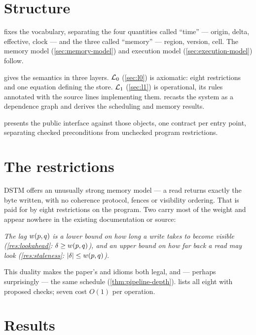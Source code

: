 \section*{Structure}

 fixes the vocabulary, separating the four quantities
called ``time'' --- origin, delta, effective, clock --- and the three called
``memory'' --- region, version, cell. The memory model
(\cref{sec:memory-model}) and execution model (\cref{sec:execution-model})
follow.

 gives the semantics in three layers. $\mathcal{L}_0$
(\cref{sec:l0}) is axiomatic: eight restrictions and one equation defining the
store. $\mathcal{L}_1$ (\cref{sec:l1}) is operational, its rules annotated with the
source lines implementing them.  recasts the system as a
dependence graph and derives the scheduling and memory results.

 presents the public interface against those objects, one
contract per entry point, separating checked preconditions from unchecked
program restrictions.

\section*{The restrictions}

DSTM offers an unusually strong memory model --- a read returns exactly the
byte written, with no coherence protocol, fences or visibility ordering. That
is paid for by eight restrictions on the program. Two carry most of the weight
and appear nowhere in the existing documentation or source:

\begin{center}
\begin{minipage}{0.88\textwidth}
\itshape
The \gls{lag} $w(p,q)$ is a lower bound on how long a write takes to
become visible (\cref{res:lookahead}: $\delta \ge w(p,q)$), and an upper
bound on how far back a read may look (\cref{res:staleness}:
$|\delta| \le w(p,q)$).
\end{minipage}
\end{center}

This duality makes the paper's  and
 idioms both legal, and --- perhaps surprisingly ---
the same schedule (\cref{thm:pipeline-depth}).  lists
all eight with proposed checks; seven cost $O(1)$ per \gls{operation}.

\section*{Results}

